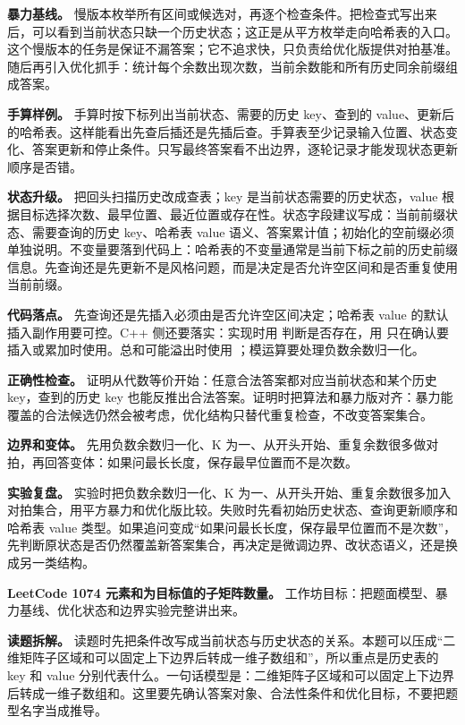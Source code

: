 \textbf{暴力基线。} 慢版本枚举所有区间或候选对，再逐个检查条件。把检查式写出来后，可以看到当前状态只缺一个历史状态；这正是从平方枚举走向哈希表的入口。这个慢版本的任务是保证不漏答案；它不追求快，只负责给优化版提供对拍基准。随后再引入优化抓手：统计每个余数出现次数，当前余数能和所有历史同余前缀组成答案。

\textbf{手算样例。} 手算时按下标列出当前状态、需要的历史 key、查到的 value、更新后的哈希表。这样能看出先查后插还是先插后查。手算表至少记录输入位置、状态变化、答案更新和停止条件。只写最终答案看不出边界，逐轮记录才能发现状态更新顺序是否错。

\textbf{状态升级。} 把回头扫描历史改成查表；key 是当前状态需要的历史状态，value 根据目标选择次数、最早位置、最近位置或存在性。状态字段建议写成：当前前缀状态、需要查询的历史 key、哈希表 value 语义、答案累计值；初始化的空前缀必须单独说明。不变量要落到代码上：哈希表的不变量通常是当前下标之前的历史前缀信息。先查询还是先更新不是风格问题，而是决定是否允许空区间和是否重复使用当前前缀。

\textbf{代码落点。} 先查询还是先插入必须由是否允许空区间决定；哈希表 value 的默认插入副作用要可控。C++ 侧还要落实：实现时用  判断是否存在，用  只在确认要插入或累加时使用。总和可能溢出时使用 ；模运算要处理负数余数归一化。

\textbf{正确性检查。} 证明从代数等价开始：任意合法答案都对应当前状态和某个历史 key，查到的历史 key 也能反推出合法答案。证明时把算法和暴力版对齐：暴力能覆盖的合法候选仍然会被考虑，优化结构只替代重复检查，不改变答案集合。

\textbf{边界和变体。} 先用负数余数归一化、K 为一、从开头开始、重复余数很多做对拍，再回答变体：如果问最长长度，保存最早位置而不是次数。

\textbf{实验复盘。} 实验时把负数余数归一化、K 为一、从开头开始、重复余数很多加入对拍集合，用平方暴力和优化版比较。失败时先看初始历史状态、查询更新顺序和哈希表 value 类型。如果追问变成“如果问最长长度，保存最早位置而不是次数”，先判断原状态是否仍然覆盖新答案集合，再决定是微调边界、改状态语义，还是换成另一类结构。

\noindent\textbf{LeetCode 1074 元素和为目标值的子矩阵数量。} 工作坊目标：把题面模型、暴力基线、优化状态和边界实验完整讲出来。

\textbf{读题拆解。} 读题时先把条件改写成当前状态与历史状态的关系。本题可以压成“二维矩阵子区域和可以固定上下边界后转成一维子数组和”，所以重点是历史表的 key 和 value 分别代表什么。一句话模型是：二维矩阵子区域和可以固定上下边界后转成一维子数组和。这里要先确认答案对象、合法性条件和优化目标，不要把题型名字当成推导。

